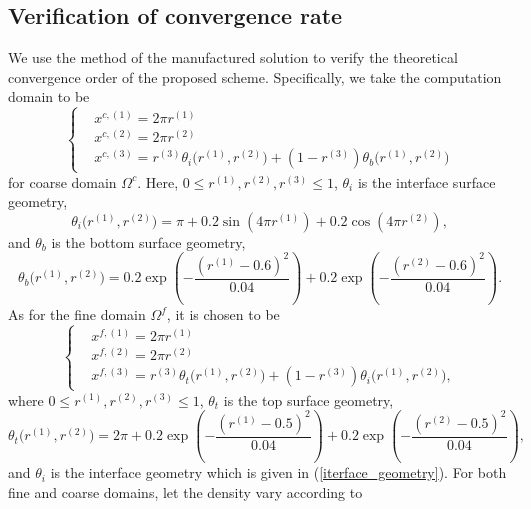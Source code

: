 \subsection{Verification of convergence rate}\label{convergence_study}
We use the method of the manufactured solution to verify the theoretical convergence order of the proposed scheme. Specifically, we take the computation domain to be 
\begin{equation}\label{coarse_domain_manufactured}
\left\{
\begin{aligned}
& x^{c,(1)} = 2\pi r^{(1)}\\
& x^{c,(2)} = 2\pi r^{(2)}\\
& x^{c,(3)} = r^{(3)}\theta_i\big(r^{(1)},r^{(2)}\big) + (1-r^{(3)})\theta_b\big(r^{(1)},r^{(2)}\big)
\end{aligned}
\right.
\end{equation}
for coarse domain $\Omega^c$. Here, $0\leq r^{(1)}, r^{(2)}, r^{(3)}\leq 1$, $\theta_i$ is the interface surface geometry,
\begin{equation}\label{iterface_geometry}
\theta_i\big(r^{(1)},r^{(2)}\big) = \pi+0.2\sin(4\pi r^{(1)})+0.2\cos(4\pi r^{(2)}),
\end{equation}
and 
$\theta_b$ is the bottom surface geometry,
\begin{equation}\label{bottom_geometry}
\theta_b\big(r^{(1)},r^{(2)}\big) = 0.2\exp\left(-\frac{(r^{(1)}-0.6)^2}{0.04}\right)+0.2\exp\left(-\frac{(r^{(2)}-0.6)^2}{0.04}\right).
\end{equation}
As for the fine domain $\Omega^f$, it is chosen to be
\begin{equation}\label{fine_domain_manufactured}
\left\{
\begin{aligned}
& x^{f,(1)} = 2\pi r^{(1)}\\
& x^{f,(2)} = 2\pi r^{(2)}\\
& x^{f,(3)} = r^{(3)}\theta_t\big(r^{(1)},r^{(2)}\big) + (1-r^{(3)})\theta_i\big(r^{(1)},r^{(2)}\big),
\end{aligned}
\right.
\end{equation}
where $0\leq r^{(1)}, r^{(2)}, r^{(3)}\leq 1$, $\theta_t$ is the top surface geometry,
\begin{equation}\label{top_geometry}
\theta_t\big(r^{(1)},r^{(2)}\big) = 2\pi+0.2\exp\left(-\frac{(r^{(1)}-0.5)^2}{0.04}\right)+0.2\exp\left(-\frac{(r^{(2)}-0.5)^2}{0.04}\right),
\end{equation}
and $\theta_i$ is the interface geometry which is given in (\ref{iterface_geometry}). For both fine and coarse domains, let the density vary according to
